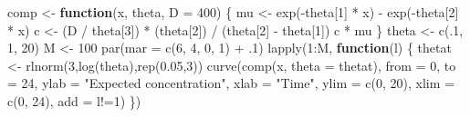 \documentclass[
  ignorenonframetext,
]{beamer}
\newenvironment{Shaded}{\begin{snugshade}}{\end{snugshade}}
\newcommand{\AttributeTok}[1]{\textcolor[rgb]{0.77,0.63,0.00}{#1}}
\newcommand{\ControlFlowTok}[1]{\textcolor[rgb]{0.13,0.29,0.53}{\textbf{#1}}}
\newcommand{\DecValTok}[1]{\textcolor[rgb]{0.00,0.00,0.81}{#1}}
\newcommand{\FloatTok}[1]{\textcolor[rgb]{0.00,0.00,0.81}{#1}}
\newcommand{\FunctionTok}[1]{\textcolor[rgb]{0.00,0.00,0.00}{#1}}
\newcommand{\NormalTok}[1]{#1}
\newcommand{\OtherTok}[1]{\textcolor[rgb]{0.56,0.35,0.01}{#1}}
\newcommand{\SpecialCharTok}[1]{\textcolor[rgb]{0.00,0.00,0.00}{#1}}
\newcommand{\StringTok}[1]{\textcolor[rgb]{0.31,0.60,0.02}{#1}}
\begin{document}
\begin{frame}[fragile]{}
\protect\hypertarget{section-21}{}
\begin{Shaded}
\begin{Highlighting}[]
\NormalTok{comp }\OtherTok{\textless{}{-}} \ControlFlowTok{function}\NormalTok{(x, theta, }\AttributeTok{D =} \DecValTok{400}\NormalTok{) \{}
\NormalTok{    mu }\OtherTok{\textless{}{-}} \FunctionTok{exp}\NormalTok{(}\SpecialCharTok{{-}}\NormalTok{theta[}\DecValTok{1}\NormalTok{] }\SpecialCharTok{*}\NormalTok{ x) }\SpecialCharTok{{-}} \FunctionTok{exp}\NormalTok{(}\SpecialCharTok{{-}}\NormalTok{theta[}\DecValTok{2}\NormalTok{] }\SpecialCharTok{*}\NormalTok{ x)}
\NormalTok{    c }\OtherTok{\textless{}{-}}\NormalTok{ (D }\SpecialCharTok{/}\NormalTok{ theta[}\DecValTok{3}\NormalTok{]) }\SpecialCharTok{*}\NormalTok{ (theta[}\DecValTok{2}\NormalTok{]) }\SpecialCharTok{/}\NormalTok{ (theta[}\DecValTok{2}\NormalTok{] }\SpecialCharTok{{-}}\NormalTok{ theta[}\DecValTok{1}\NormalTok{])}
\NormalTok{    c }\SpecialCharTok{*}\NormalTok{ mu \}}
\NormalTok{theta }\OtherTok{\textless{}{-}} \FunctionTok{c}\NormalTok{(.}\DecValTok{1}\NormalTok{, }\DecValTok{1}\NormalTok{, }\DecValTok{20}\NormalTok{)}
\NormalTok{M }\OtherTok{\textless{}{-}} \DecValTok{100}
\FunctionTok{par}\NormalTok{(}\AttributeTok{mar =} \FunctionTok{c}\NormalTok{(}\DecValTok{6}\NormalTok{, }\DecValTok{4}\NormalTok{, }\DecValTok{0}\NormalTok{, }\DecValTok{1}\NormalTok{) }\SpecialCharTok{+}\NormalTok{ .}\DecValTok{1}\NormalTok{)}
\FunctionTok{lapply}\NormalTok{(}\DecValTok{1}\SpecialCharTok{:}\NormalTok{M, }\ControlFlowTok{function}\NormalTok{(l) \{}
\NormalTok{  thetat }\OtherTok{\textless{}{-}} \FunctionTok{rlnorm}\NormalTok{(}\DecValTok{3}\NormalTok{,}\FunctionTok{log}\NormalTok{(theta),}\FunctionTok{rep}\NormalTok{(}\FloatTok{0.05}\NormalTok{,}\DecValTok{3}\NormalTok{))}
  \FunctionTok{curve}\NormalTok{(}\FunctionTok{comp}\NormalTok{(x, }\AttributeTok{theta =}\NormalTok{ thetat), }\AttributeTok{from =} \DecValTok{0}\NormalTok{, }\AttributeTok{to =} \DecValTok{24}\NormalTok{, }\AttributeTok{ylab =} \StringTok{"Expected concentration"}\NormalTok{, }
        \AttributeTok{xlab =} \StringTok{"Time"}\NormalTok{, }\AttributeTok{ylim =} \FunctionTok{c}\NormalTok{(}\DecValTok{0}\NormalTok{, }\DecValTok{20}\NormalTok{), }\AttributeTok{xlim =} \FunctionTok{c}\NormalTok{(}\DecValTok{0}\NormalTok{, }\DecValTok{24}\NormalTok{), }\AttributeTok{add =}\NormalTok{ l}\SpecialCharTok{!=}\DecValTok{1}\NormalTok{) \})}
\end{Highlighting}
\end{Shaded}


\end{frame}
\end{document}

